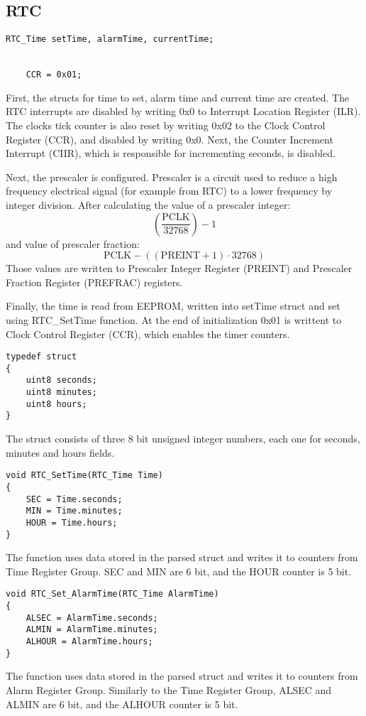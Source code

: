 \documentclass[10pt]{article}
\begin{document}
    \subsection{RTC}
	\begin{lstlisting}[caption = {RTC initialization}]
	RTC_Time setTime, alarmTime, currentTime;


    CCR = 0x01;
	\end{lstlisting}

	First, the structs for time to set, alarm time and current time are created. The RTC interrupts are disabled by writing 0x0 to Interrupt Location Register (ILR).  The clocks tick counter is also reset by writing 0x02 to the Clock Control Register (CCR), and disabled by writing 0x0. Next, the Counter Increment Interrupt (CIIR), which is responsible for incrementing seconds, is disabled. 

Next, the prescaler is configured. Prescaler is a circuit used to reduce a high frequency electrical signal (for example from RTC) to a lower frequency by integer division. After calculating the value of a prescaler integer:
\[ \left(\frac{\mathrm{PCLK}}{32768}\right) - 1 \]
and value of prescaler fraction:
\[ \mathrm{PCLK} - \left((\mathrm{PREINT} + 1) \cdot 32768\right) \]
Those values are written to Prescaler Integer Register (PREINT) and Prescaler Fraction Register (PREFRAC) registers.

Finally, the time is read from EEPROM, written into setTime struct and set using RTC\_SetTime function. At the end of initialization 0x01 is writtent to Clock Control Register (CCR), which enables the timer counters.

	\begin{lstlisting}[caption = {RTC struct}]
typedef struct
{
	uint8 seconds;
	uint8 minutes;
	uint8 hours;
} 
	\end{lstlisting}
	The struct consists of three 8 bit unsigned integer numbers, each one for seconds, minutes and hours fields.

	\begin{lstlisting}[caption = {Setting time in the register function}]
void RTC_SetTime(RTC_Time Time)
{
	SEC = Time.seconds;
	MIN = Time.minutes;
	HOUR = Time.hours;
}
	\end{lstlisting}
	The function uses data stored in the parsed struct and writes it to counters from Time Register Group. SEC and MIN are 6 bit, and the HOUR counter is 5 bit.

	\begin{lstlisting}[caption = {Setting alarm time in the register function}]
void RTC_Set_AlarmTime(RTC_Time AlarmTime)
{
	ALSEC = AlarmTime.seconds;
	ALMIN = AlarmTime.minutes;
	ALHOUR = AlarmTime.hours;
}
	\end{lstlisting}
	The function uses data stored in the parsed struct and writes it to counters from Alarm Register Group. Similarly to the Time Register Group, ALSEC and ALMIN are 6 bit, and the ALHOUR counter is 5 bit.
\end{document}
